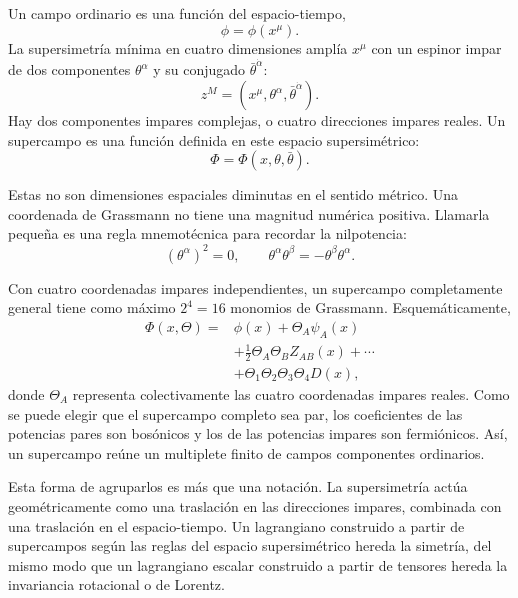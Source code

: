 Un campo ordinario es una función del espacio-tiempo,
\begin{equation}
\phi=\phi(x^\mu).
\end{equation}
La supersimetría mínima en cuatro dimensiones amplía \(x^\mu\) con un espinor impar de dos componentes \(\theta^\alpha\) y su conjugado \(\bar\theta^{\dot\alpha}\):
\begin{equation}
z^M=(x^\mu,\theta^\alpha,\bar\theta^{\dot\alpha}).
\end{equation}
Hay dos componentes impares complejas, o cuatro direcciones impares reales. Un supercampo es una función definida en este espacio supersimétrico:
\begin{equation}
\Phi=\Phi(x,\theta,\bar\theta).
\end{equation}

Estas no son dimensiones espaciales diminutas en el sentido métrico. Una coordenada de Grassmann no tiene una magnitud numérica positiva. Llamarla pequeña es una regla mnemotécnica para recordar la nilpotencia:
\begin{equation}
(\theta^\alpha)^2=0,
\qquad
\theta^\alpha\theta^\beta=-\theta^\beta\theta^\alpha.
\end{equation}

Con cuatro coordenadas impares independientes, un supercampo completamente general tiene como máximo \(2^4=16\) monomios de Grassmann. Esquemáticamente,
\begin{equation}
\begin{aligned}
\Phi(x,\Theta)={}&\phi(x)+\Theta_A\psi_A(x)\\
&+\frac{1}{2}\Theta_A\Theta_B Z_{AB}(x)+\cdots\\
&+\Theta_1\Theta_2\Theta_3\Theta_4D(x),
\end{aligned}
\end{equation}
donde \(\Theta_A\) representa colectivamente las cuatro coordenadas impares reales. Como se puede elegir que el supercampo completo sea par, los coeficientes de las potencias pares son bosónicos y los de las potencias impares son fermiónicos. Así, un supercampo reúne un multiplete finito de campos componentes ordinarios.

Esta forma de agruparlos es más que una notación. La supersimetría actúa geométricamente como una traslación en las direcciones impares, combinada con una traslación en el espacio-tiempo. Un lagrangiano construido a partir de supercampos según las reglas del espacio supersimétrico hereda la simetría, del mismo modo que un lagrangiano escalar construido a partir de tensores hereda la invariancia rotacional o de Lorentz.

